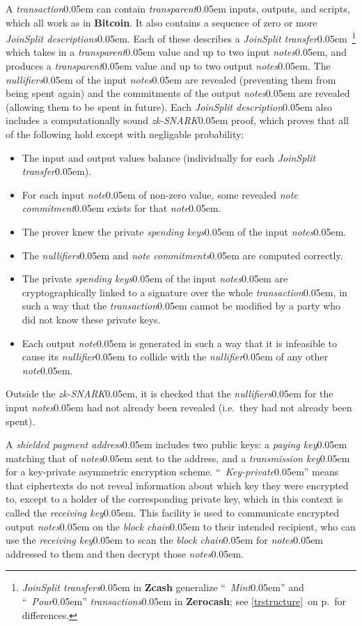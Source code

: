 \documentclass{article}
\renewcommand{\emph}[1]{\hspace{0.15em}{\fontfamily{pnc}\selectfont\scalebox{1.02}[0.999]{\textit{#1}}}\hspace{0.02em}}
\newcommand{\crossref}[1]{\autoref{#1}\, \emph{`\nameref*{#1}\kern -0.05em'} on p.\,\pageref*{#1}}
\newcommand{\introlist}{\needspace{15ex}}
\newcommand{\hairspace}{~\!}
\newcommand{\sprout}[1]{}
\newcommand{\sprout}[1]{#1}
\numberwithin{theorem}{subsection}
\newcommand{\term}[1]{\textsl{#1}\kern 0.05em\xspace}
\newcommand{\termbf}[1]{\textbf{#1}\xspace}
\newcommand{\quotedterm}[1]{``~\!\!\term{#1}''}
\newcommand{\Zcash}{\termbf{Zcash}}
\newcommand{\Zerocash}{\termbf{Zerocash}}
\newcommand{\Bitcoin}{\termbf{Bitcoin}}
\newcommand{\note}{\term{note}}
\newcommand{\notes}{\term{notes}}
\newcommand{\noteCommitment}{\term{note commitment}}
\newcommand{\noteCommitments}{\term{note commitments}}
\newcommand{\joinSplitDescription}{\term{JoinSplit description}}
\newcommand{\joinSplitDescriptions}{\term{JoinSplit descriptions}}
\newcommand{\joinSplitTransfer}{\term{JoinSplit transfer}}
\newcommand{\joinSplitTransfers}{\term{JoinSplit transfers}}
\newcommand{\transaction}{\term{transaction}}
\newcommand{\transactions}{\term{transactions}}
\newcommand{\transparent}{\term{transparent}}
\newcommand{\blockchain}{\term{block chain}}
\newcommand{\nullifier}{\term{nullifier}}
\newcommand{\nullifiers}{\term{nullifiers}}
\newcommand{\paymentAddress}{\term{shielded payment address}}
\newcommand{\receivingKey}{\term{receiving key}}
\newcommand{\spendingKeys}{\term{spending keys}}
\newcommand{\payingKey}{\term{paying key}}
\newcommand{\transmissionKey}{\term{transmission key}}
\newcommand{\zkSNARK}{\term{zk-SNARK}}
\begin{document}
\introlist
A \transaction can contain \transparent inputs, outputs, and scripts, which all
work as in \Bitcoin \cite{Bitc-Protocol}. It also contains a sequence of zero or
more \joinSplitDescriptions. Each of these describes a \joinSplitTransfer\hairspace\footnote{
\joinSplitTransfers in \Zcash generalize \quotedterm{Mint} and \quotedterm{Pour}
\transactions in \Zerocash; see \crossref{trstructure} for differences.}
which takes in a \transparent value and up to two input \notes, and produces a
\transparent value and up to two output \notes. The \nullifiers of the input
\notes are revealed (preventing them from being spent again) and the
commitments of the output \notes are revealed (allowing them to be spent in
future). Each \joinSplitDescription also includes a computationally sound
\zkSNARK proof, which proves that all of the following hold except with
negligable probability:

\begin{itemize}
  \item The input and output values balance (individually for each \joinSplitTransfer).
  \item For each input \note of non-zero value, some revealed \noteCommitment
        exists for that \note.
  \item The prover knew the private \spendingKeys of the input \notes.
  \item The \nullifiers and \noteCommitments are computed correctly.
  \item The private \spendingKeys of the input \notes are cryptographically
        linked to a signature over the whole \transaction, in such a way that
        the \transaction cannot be modified by a party who did not know these
        private keys.
  \item Each output \note is generated in such a way that it is infeasible to
        cause its \nullifier to collide with the \nullifier of any other \note.
\end{itemize}

Outside the \zkSNARK, it is \sprout{also} checked that the \nullifiers for the input
\notes had not already been revealed (i.e.\ they had not already been spent).

A \paymentAddress includes two public keys: a \payingKey matching that of \notes
sent to the address, and a \transmissionKey for a key-private asymmetric encryption
scheme. \quotedterm{Key-private} means that ciphertexts do not reveal information
about which key they were encrypted to, except to a holder of the corresponding
private key, which in this context is called the \receivingKey. This facility is
used to communicate encrypted output \notes on the \blockchain to their
intended recipient, who can use the \receivingKey to scan the \blockchain for
\notes addressed to them and then decrypt those \notes.
\end{document}
